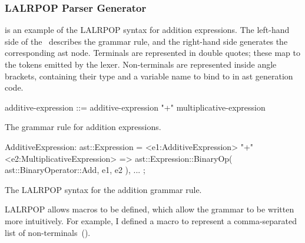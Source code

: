 \documentclass[00-main.tex]{subfiles}
\begin{document}
\subsubsection{LALRPOP Parser Generator}

 is an example of the LALRPOP syntax for addition expressions.
The left-hand side of the~\RustInline{=>} describes the grammar rule, and the right-hand side generates the corresponding \gls{ast} node.
Terminals are represented in double quotes; these map to the tokens emitted by the lexer.
Non-terminals are represented inside angle brackets, containing their type and a variable name to bind to in \gls{ast} generation code.

\begin{listing}[t]
  \begin{sublisting}[t]{\textwidth}
    \begin{GrammarListing}
      additive-expression ::= additive-expression "+" multiplicative-expression
    \end{GrammarListing}
    \caption{The grammar rule for addition expressions.}
    \label{sublst:addition expr grammar rule}
  \end{sublisting}
  \par\medskip %
  \begin{sublisting}[t]{\textwidth}
    \begin{RustListing}
      AdditiveExpression: ast::Expression = {
          <e1:AdditiveExpression> "+" <e2:MultiplicativeExpression>
              => ast::Expression::BinaryOp(
                  ast::BinaryOperator::Add,
                  e1,
                  e2
              ),
          ...
      };
    \end{RustListing}
    \caption{The LALRPOP syntax for the addition grammar rule.}
    \label{sublst:lalrpop syntax addition rule}
  \end{sublisting}
  \caption{%
    Example of the LALRPOP syntax for grammar rules.
     is the rule for an addition expression, and~ is the Rust code to represent it.
    In LALRPOP, the grammar parsing and \gls{ast} generation code are combined.\bigskip
  }
  \label{lst:AST generation code example}
\end{listing}

LALRPOP allows macros to be defined, which allow the grammar to be written more intuitively.
For example, I defined a macro to represent a comma-separated list of non-terminals~().
\end{document}
